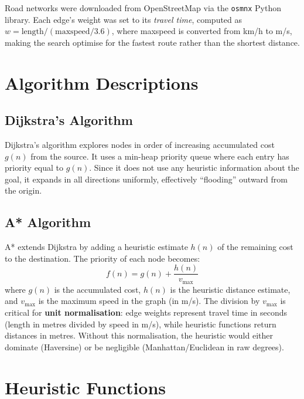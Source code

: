 \documentclass[12pt,a4paper]{article}
\begin{document}
Road networks were downloaded from OpenStreetMap via the \texttt{osmnx} Python library. Each edge's weight was set to its \emph{travel time}, computed as $w = \text{length} / (\text{maxspeed} / 3.6)$, where maxspeed is converted from km/h to m/s, making the search optimise for the fastest route rather than the shortest distance.


\section{Algorithm Descriptions}

\subsection{Dijkstra's Algorithm}

Dijkstra's algorithm explores nodes in order of increasing accumulated cost $g(n)$ from the source. It uses a min-heap priority queue where each entry has priority equal to $g(n)$. Since it does not use any heuristic information about the goal, it expands in all directions uniformly, effectively ``flooding'' outward from the origin.

\subsection{A* Algorithm}

A* extends Dijkstra by adding a heuristic estimate $h(n)$ of the remaining cost to the destination.  The priority of each node becomes:
\[
  f(n) = g(n) + \frac{h(n)}{v_{\max}}
\]
where $g(n)$ is the accumulated cost, $h(n)$ is the heuristic distance estimate, and $v_{\max}$ is the maximum speed in the graph (in m/s). The division by $v_{\max}$ is critical for \textbf{unit normalisation}: edge weights represent travel time in seconds (length in metres divided by speed in m/s), while heuristic functions return distances in metres. Without this normalisation, the heuristic would either dominate (Haversine) or be negligible (Manhattan/Euclidean in raw degrees).


\section{Heuristic Functions}
\end{document}
